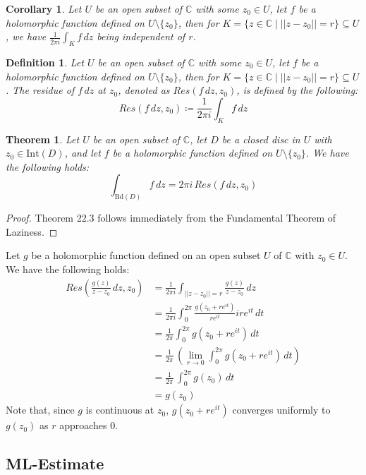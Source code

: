 \documentclass[15pt]{book}
\theoremstyle{break}
\theoremstyle{break}
\newtheorem{thm}{Theorem}[section]
\newtheorem{corT}[lem]{Corollary}
\newtheorem{defn}{Definition}[corL]
\newcommand{\Int}{\text{Int}}
\newcommand{\Bd}{\text{Bd}}
\newcommand{\Complex}{\mathbb{C}}
\begin{document}
\begin{corT}
Let $U$ be an open subset of $\Complex$ with some $z_0 \in U$, let $f$ be a holomorphic function defined on $U\setminus \{z_0\}$, then for $K = \{z \in \Complex \mid ||z - z_0|| = r\} \subseteq U$, we have $\frac{1}{2\pi i}\int_K f\, dz$ being independent of $r$. 
\end{corT}

\begin{defn}
Let $U$ be an open subset of $\Complex$ with some $z_0 \in U$, let $f$ be a holomorphic function defined on $U\setminus \{z_0\}$, then for $K = \{z \in \Complex \mid ||z - z_0|| = r\} \subseteq U$. The residue of $f\, dz$ at $z_0$, denoted as $Res(f\,dz, z_0)$, is defined by the following: $$Res(f\,dz, z_0)\coloneqq \frac{1}{2\pi i}\int_K f\, dz$$
\end{defn}


\begin{thm}
Let $U$ be an open subset of $\Complex$, let $D$ be a closed disc in $U$ with $z_0 \in \Int(D)$, and let $f$ be a holomorphic function defined on $U \setminus \{ z_0\}$. We have the following holds:
$$\int_{\Bd(D)} f\, dz = 2\pi i \, Res(f\, dz, z_0)$$
\end{thm}
\begin{proof}
Theorem 22.3 follows immediately from the Fundamental Theorem of Laziness.
\end{proof}


Let $g$ be a holomorphic function defined on an open subset $U$ of $\Complex$ with $z_0 \in U$.\\ 
We have the following holds:
\begin{align*}
Res\left(\frac{g(z)}{z-z_0}\, dz, z_0\right) &= \frac{1}{2\pi i}\int_{||z-z_0||=r} \frac{g(z)}{z-z_0}\, dz \\
&=\frac{1}{2\pi i} \int_0^{2\pi} \frac{g(z_0+re^{it})}{re^{it}}ire^{it}\, dt \\
&=\frac{1}{2\pi}\int_0^{2\pi} g(z_0+re^{it})\, dt\\
&= \frac{1}{2\pi}\,\left(\lim_{r \to 0}\int_0^{2\pi} g(z_0+re^{it})\, dt\right)\\
&= \frac{1}{2\pi}\, \int_0^{2\pi} g(z_0)\, dt\\
&= g(z_0)
\end{align*}
Note that, since $g$ is continuous at $z_0$, $g(z_0+re^{it})$ converges uniformly to $g(z_0)$ as $r$ approaches $0$.\\


\newpage
\subsection*{ML-Estimate}
\end{document}
